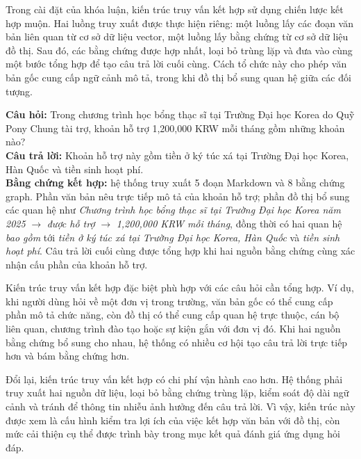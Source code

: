 Trong cài đặt của khóa luận, kiến trúc truy vấn kết hợp sử dụng chiến lược kết hợp muộn. Hai luồng truy xuất được thực hiện riêng: một luồng lấy các đoạn văn bản liên quan từ cơ sở dữ liệu vector, một luồng lấy bằng chứng từ cơ sở dữ liệu đồ thị. Sau đó, các bằng chứng được hợp nhất, loại bỏ trùng lặp và đưa vào cùng một bước tổng hợp để tạo câu trả lời cuối cùng. Cách tổ chức này cho phép văn bản gốc cung cấp ngữ cảnh mô tả, trong khi đồ thị bổ sung quan hệ giữa các đối tượng.

\begin{tcolorbox}[
    enhanced,
    breakable,
    title={Ví dụ minh họa -- Hybrid search},
    fonttitle=\bfseries,
    colback=red!2,
    colframe=darkblue!70,
    boxrule=0.5pt,
    arc=1.5mm,
    left=6pt,
    right=6pt,
    top=5pt,
    bottom=5pt
]
\small
\textbf{Câu hỏi:} Trong chương trình học bổng thạc sĩ tại Trường Đại học Korea do Quỹ Pony Chung tài trợ, khoản hỗ trợ 1,200,000 KRW mỗi tháng gồm những khoản nào?\\
\textbf{Câu trả lời:} Khoản hỗ trợ này gồm tiền ở ký túc xá tại Trường Đại học Korea, Hàn Quốc và tiền sinh hoạt phí.\\
\textbf{Bằng chứng kết hợp:} hệ thống truy xuất 5 đoạn Markdown và 8 bằng chứng graph. Phần văn bản nêu trực tiếp mô tả của khoản hỗ trợ; phần đồ thị bổ sung các quan hệ như \textit{Chương trình học bổng thạc sĩ tại Trường Đại học Korea năm 2025} $\rightarrow$ \textit{được hỗ trợ} $\rightarrow$ \textit{1,200,000 KRW mỗi tháng}, đồng thời có hai quan hệ \textit{bao gồm} tới \textit{tiền ở ký túc xá tại Trường Đại học Korea, Hàn Quốc} và \textit{tiền sinh hoạt phí}. Câu trả lời cuối cùng được tổng hợp khi hai nguồn bằng chứng cùng xác nhận cấu phần của khoản hỗ trợ.\\
\end{tcolorbox}


Kiến trúc truy vấn kết hợp đặc biệt phù hợp với các câu hỏi cần tổng hợp. Ví dụ, khi người dùng hỏi về một đơn vị trong trường, văn bản gốc có thể cung cấp phần mô tả chức năng, còn đồ thị có thể cung cấp quan hệ trực thuộc, cán bộ liên quan, chương trình đào tạo hoặc sự kiện gắn với đơn vị đó. Khi hai nguồn bằng chứng bổ sung cho nhau, hệ thống có nhiều cơ hội tạo câu trả lời trực tiếp hơn và bám bằng chứng hơn.

Đổi lại, kiến trúc truy vấn kết hợp có chi phí vận hành cao hơn. Hệ thống phải truy xuất hai nguồn dữ liệu, loại bỏ bằng chứng trùng lặp, kiểm soát độ dài ngữ cảnh và tránh để thông tin nhiễu ảnh hưởng đến câu trả lời. Vì vậy, kiến trúc này được xem là cấu hình kiểm tra lợi ích của việc kết hợp văn bản với đồ thị, còn mức cải thiện cụ thể được trình bày trong mục kết quả đánh giá ứng dụng hỏi đáp.
